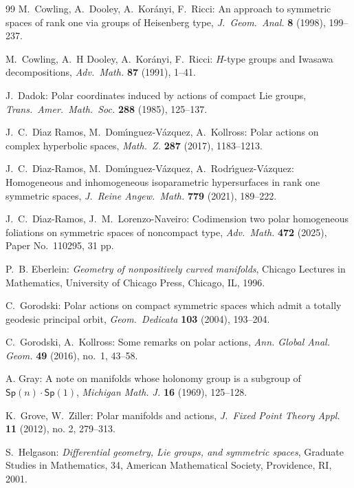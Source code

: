 \documentclass[12pt, a4paper]{amsart}
\theoremstyle{definition}
\begin{document}
\begin{thebibliography}{99}
M.~Cowling, A.~Dooley, A.~Kor\'{a}nyi, F.~Ricci: An approach to symmetric spaces of rank one via groups of Heisenberg type, 
\textit{J.\ Geom.\ Anal.} \textbf{8} (1998), 199--237.

M.~Cowling, A.~H Dooley, A.~Kor\'{a}nyi, F.~Ricci: $H$-type groups and Iwasawa decompositions, 
\textit{Adv.\ Math.} \textbf{87} (1991), 1--41.

J.~Dadok: Polar coordinates induced by actions of compact Lie groups, \textit{Trans.\ Amer.\ Math.\ Soc.} \textbf{288} (1985), 125--137.

J.~C.~D\'{\i}az Ramos, M.~Dom\'{\i}nguez-V\'{a}zquez, A.~Kollross: Polar actions on complex hyperbolic spaces, 
\textit{Math.\ Z.} \textbf{287} (2017), 1183--1213.

J.~C.~D\'{\i}az-Ramos, M.~Dom\'{\i}nguez-V\'{a}zquez, A.~Rodr\'{\i}guez-V\'{a}zquez: Homogeneous and inhomogeneous isoparametric hypersurfaces in rank one symmetric spaces, 
\textit{J.\ Reine Angew.\ Math.} \textbf{779} (2021), 189--222.

J.~C.~D\'{\i}az-Ramos, J.~M.~Lorenzo-Naveiro: Codimension two polar homogeneous foliations on symmetric spaces of noncompact type, 
\textit{Adv.\ Math.} \textbf{472} (2025), Paper No.~110295, 31 pp.

P.~B. Eberlein: \emph{Geometry of nonpositively curved manifolds}, Chicago Lectures in Mathematics, University of Chicago Press, Chicago, IL, 1996.

C.~Gorodski: Polar actions on compact symmetric spaces which admit a totally geodesic principal orbit,
\textit{Geom.\ Dedicata} \textbf{103} (2004), 193--204.

C.~Gorodski, A.~Kollross: Some remarks on polar actions,
\textit{Ann. Global Anal. Geom.} {\bf 49} (2016), no.~1, 43--58.

A. Gray: A note on manifolds whose holonomy group is a subgroup of $\mathsf{Sp}(n)\cdot\mathsf{Sp}(1)$, \textit{Michigan Math. J.} \textbf{16} (1969), 125--128.

K.~Grove, W.~Ziller:
Polar manifolds and actions,
\textit{J.\ Fixed Point Theory Appl.} \textbf{11} (2012), no. 2, 279--313.

S.~Helgason: \emph{Differential geometry, Lie groups, and symmetric spaces}, 
Graduate Studies in Mathematics, 34, American Mathematical Society, Providence, RI, 2001.


\end{thebibliography}
\end{document}
